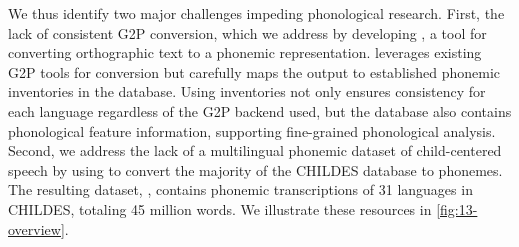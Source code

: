 
We thus identify two major challenges impeding phonological research. First, the lack of consistent G2P conversion, which we address by developing \corpusphonemizer, a tool for converting orthographic text to a phonemic representation. \corpusphonemizer leverages existing G2P tools for conversion but carefully maps the output to established phonemic inventories in the \phoible database. Using \phoible inventories not only ensures consistency for each language regardless of the G2P backend used, but the database also contains phonological feature information, supporting fine-grained phonological analysis. Second, we address the lack of a multilingual phonemic dataset of child-centered speech by using \corpusphonemizer to convert the majority of the CHILDES database to phonemes. The resulting dataset, \ipachildes, contains phonemic transcriptions of 31 languages in CHILDES, totaling 45 million words. We illustrate these resources in \cref{fig:13-overview}.



